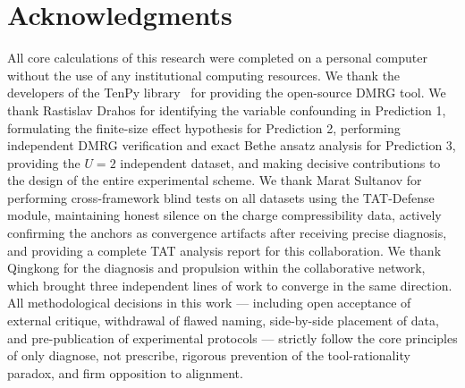 \documentclass[prb,reprint,twocolumn,superscriptaddress]{revtex4-2}
\begin{document}
\section*{Acknowledgments}

All core calculations of this research were completed on a personal computer without the use of any institutional computing resources. We thank the developers of the TenPy library~\cite{Hauschild2018} for providing the open-source DMRG tool. We thank Rastislav Drahos for identifying the variable confounding in Prediction 1, formulating the finite-size effect hypothesis for Prediction 2, performing independent DMRG verification and exact Bethe ansatz analysis for Prediction 3, providing the $U=2$ independent dataset, and making decisive contributions to the design of the entire experimental scheme. We thank Marat Sultanov for performing cross-framework blind tests on all datasets using the TAT-Defense module, maintaining honest silence on the charge compressibility data, actively confirming the anchors as convergence artifacts after receiving precise diagnosis, and providing a complete TAT analysis report for this collaboration. We thank Qingkong for the diagnosis and propulsion within the collaborative network, which brought three independent lines of work to converge in the same direction. All methodological decisions in this work --- including open acceptance of external critique, withdrawal of flawed naming, side-by-side placement of data, and pre-publication of experimental protocols --- strictly follow the core principles of only diagnose, not prescribe, rigorous prevention of the tool-rationality paradox, and firm opposition to alignment.
\end{document}
